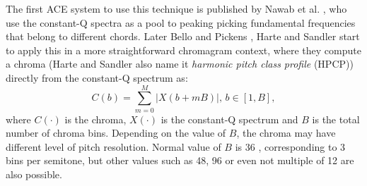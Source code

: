 The first ACE system to use this technique is published by Nawab et al. \cite{nawab2001identification}, who use the constant-Q spectra as a pool to peaking picking fundamental frequencies that belong to different chords. Later Bello and Pickens \cite{bello2005robust}, Harte and Sandler \cite{harte2005automatic} start to apply this in a more straightforward chromagram context, where they compute a chroma (Harte and Sandler also name it {\it harmonic pitch class profile} (HPCP)) directly from the constant-Q spectrum as:
\begin{equation}\label{eq:cqt-chroma}
C(b) = \sum_{m=0}^M |X(b+mB)| ,\, b \in [1,B],
\end{equation}
where $C(\cdot)$ is the chroma, $X(\cdot)$ is the constant-Q spectrum and $B$ is the total number of chroma bins. Depending on the value of $B$, the chroma may have different level of pitch resolution. Normal value of $B$ is 36 \cite{bello2005robust,harte2005automatic,oudre2010template,reed2009minimum,weil2009automatic,humphrey2012rethinking,cho2014improved}, corresponding to 3 bins per semitone, but other values such as 48, 96 or even not multiple of 12 are also possible.

